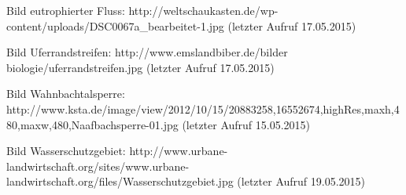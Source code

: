 \documentclass{beamer}
\begin{document}
\begin{thebibliography}{99}
		 Bild eutrophierter Fluss: http://weltschaukasten.de/wp-content/uploads/DSC0067a\_bearbeitet-1.jpg (letzter Aufruf 17.05.2015)
		
		 Bild Uferrandstreifen: http://www.emslandbiber.de/bilder biologie/uferrandstreifen.jpg (letzter Aufruf 17.05.2015)
		
		 Bild Wahnbachtalsperre: http://www.ksta.de/image/view/2012/10/15/20883258,16552674,highRes,maxh,480,maxw,480,Naafbachsperre-01.jpg (letzter Aufruf 15.05.2015)
		
		 Bild Wasserschutzgebiet: http://www.urbane-landwirtschaft.org/sites/www.urbane-landwirtschaft.org/files/Wasserschutzgebiet.jpg (letzter Aufruf 19.05.2015)
		
	\end{thebibliography} 

	
\end{document}
